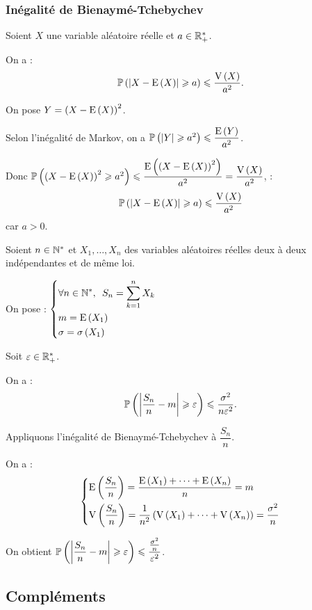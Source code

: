 \subsubsection{Inégalité de Bienaymé-Tchebychev}

\begin{prop}
Soient \(X\) une variable aléatoire réelle et \(a\in\mathbb{R}_+^*\).

On a : \[\mathbb{P}\left(\left\lvert X-\operatorname{E}\left(X\right)\right\rvert\geqslant a\right)\leqslant\dfrac{\operatorname{V}\left(X\right)}{a^2}.\]
\end{prop}

\begin{dem}
On pose \(Y=\left(X-\operatorname{E}\left(X\right)\right)^2\).

Selon l'inégalité de Markov, on a \(\mathbb{P}\left(\left\lvert Y\right\rvert\geqslant a^2\right)\leqslant\dfrac{\operatorname{E}\left(Y\right)}{a^2}\).

Donc \(\mathbb{P}\left(\left(X-\operatorname{E}\left(X\right)\right)^2\geqslant a^2\right)\leqslant\dfrac{\operatorname{E}\left(\left(X-\operatorname{E}\left(X\right)\right)^2\right)}{a^2}=\dfrac{\operatorname{V}\left(X\right)}{a^2}\), \cad : \[\mathbb{P}\left(\left\lvert X-\operatorname{E}\left(X\right)\right\rvert\geqslant a\right)\leqslant\dfrac{\operatorname{V}\left(X\right)}{a^2}\] car \(a>0\).
\end{dem}

\begin{appl}
Soient \(n\in\mathbb{N}^*\) et \(X_1,\dots,X_n\) des variables aléatoires réelles deux à deux indépendantes et de même loi.

On pose : \(\begin{dcases}
\quantifs{\forall n\in\Ns}S_n=\sum_{k=1}^nX_k \\
m=\esp{X_1} \\
\sigma=\ecarttype{X_1}
\end{dcases}\)

Soit \(\varepsilon\in\mathbb{R}_+^*\).

On a : \[\mathbb{P}\left(\left\lvert\dfrac{S_n}{n}-m\right\rvert\geqslant\varepsilon\right)\leqslant\dfrac{\sigma^2}{n\varepsilon^2}.\]
\end{appl}

\begin{dem}
Appliquons l'inégalité de Bienaymé-Tchebychev à \(\dfrac{S_n}{n}\).

On a : \[\begin{dcases}
\operatorname{E}\left(\dfrac{S_n}{n}\right)=\dfrac{\operatorname{E}\left(X_1\right)+\dots+\operatorname{E}\left(X_n\right)}{n}=m \\
\operatorname{V}\left(\dfrac{S_n}{n}\right)=\dfrac{1}{n^2}\left(\operatorname{V}\left(X_1\right)+\dots+\operatorname{V}\left(X_n\right)\right)=\dfrac{\sigma^2}{n}
\end{dcases}\]

On obtient \(\mathbb{P}\left(\left\lvert\dfrac{S_n}{n}-m\right\rvert\geqslant\varepsilon\right)\leqslant\dfrac{\frac{\sigma^2}{n}}{\varepsilon^2}\).
\end{dem}

\subsection{Compléments}

